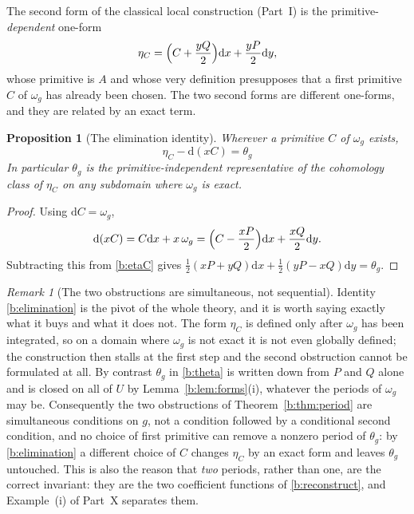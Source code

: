 \documentclass[11pt,a4paper]{article}
\numberwithin{equation}{section}
\newtheorem{proposition}[theorem]{Proposition}
\theoremstyle{definition}
\theoremstyle{remark}
\newtheorem{remark}[theorem]{Remark}
\theoremstyle{plain}
\newcommand{\om}{\omega}
\newcommand{\thet}{\theta}
\newcommand{\etaC}{\eta_{C}}
\newcommand{\pot}{C}          %
\newcommand{\dd}{\mathrm d}
\begin{document}
The second form of the classical local construction (Part~I) is the
primitive-\emph{dependent} one-form
\begin{equation}
 \etaC=\Bigl(\pot+\frac{yQ}{2}\Bigr)\dd x+\frac{yP}{2}\dd y ,
 \label{b:etaC}
\end{equation}
whose primitive is $A$ and whose very definition presupposes that a first
primitive $\pot$ of $\om_g$ has already been chosen.  The two second forms are
different one-forms, and they are related by an exact term.

\begin{proposition}[The elimination identity]
\label{b:prop:elimination}
Wherever a primitive $\pot$ of $\om_g$ exists,
\begin{equation}
 \boxed{\ \etaC-\dd(x\pot)=\thet_g\ }
 \label{b:elimination}
\end{equation}
In particular $\thet_g$ is the primitive-independent representative of the
cohomology class of $\etaC$ on any subdomain where $\om_g$ is exact.
\end{proposition}

\begin{proof}
Using $\dd\pot=\om_g$,
\[
 \dd(x\pot)=\pot\dd x+x\,\om_g
 =\Bigl(\pot-\frac{xP}{2}\Bigr)\dd x+\frac{xQ}{2}\dd y .
\]
Subtracting this from \eqref{b:etaC} gives
$\tfrac12(xP+yQ)\dd x+\tfrac12(yP-xQ)\dd y=\thet_g$.
\end{proof}

\begin{remark}[The two obstructions are simultaneous, not sequential]
\label{b:rem:simultaneous}
Identity \eqref{b:elimination} is the pivot of the whole theory, and it is
worth saying exactly what it buys and what it does not.  The form $\etaC$ is
defined only after $\om_g$ has been integrated, so on a domain where $\om_g$
is not exact it is not even globally defined; the construction then stalls at
the first step and the second obstruction cannot be formulated at all.  By
contrast $\thet_g$ in \eqref{b:theta} is written down from $P$ and $Q$ alone
and is closed on all of $U$ by Lemma~\ref{b:lem:forms}(i), whatever the
periods of $\om_g$ may be.  Consequently the two obstructions of
Theorem~\ref{b:thm:period} are simultaneous conditions on $g$, not a condition
followed by a conditional second condition, and no choice of first primitive
can remove a nonzero period of $\thet_g$: by \eqref{b:elimination} a different
choice of $\pot$ changes $\etaC$ by an exact form and leaves $\thet_g$
untouched.  This is also the reason that \emph{two} periods, rather than one,
are the correct invariant: they are the two coefficient functions of
\eqref{b:reconstruct}, and Example~(i) of Part~X separates them.
\end{remark}
\end{document}
